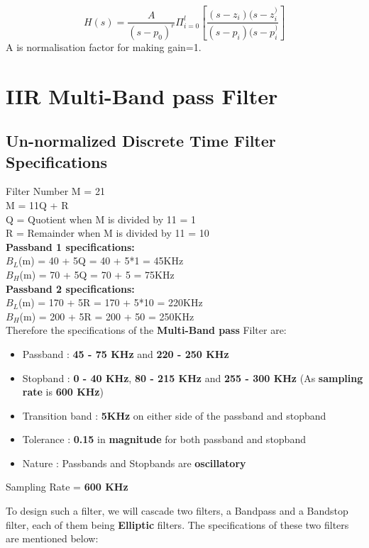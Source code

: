 \documentclass{article}
\begin{document}
\begin{equation}
    H(s) = \frac{A}{(s-p_0)^r}\Pi_{i=0}^l\left[\frac{(s-z_i)(s-z_i^)}{(s-p_i)(s-p_i^)}\right]
\end{equation}
A is normalisation factor for making gain=1.

\section{\textbf{IIR Multi-Band pass Filter}}
\subsection{\textbf{Un-normalized Discrete Time Filter Specifications}}
Filter Number M = 21\\
M = 11Q + R\\
Q = Quotient when M is divided by 11 = 1\\
R = Remainder when M is divided by 11 = 10\\
\textbf{Passband 1 specifications:} \\
$B_L$(m) = 40 + 5Q = 40 + 5*1 = 45KHz \\
$B_H$(m) = 70 + 5Q = 70 + 5 = 75KHz\\
\textbf{Passband 2 specifications:}\\
$B_L$(m) = 170 + 5R = 170 + 5*10 = 220KHz \\
$B_H$(m) = 200 + 5R = 200 + 50 = 250KHz\\
\noindent
Therefore the specifications of the \textbf{Multi-Band pass} Filter are:
\begin{itemize}
    \item Passband : \textbf{45 - 75 KHz} and \textbf{220 - 250 KHz} 
    \item Stopband : \textbf{0 - 40 KHz}, \textbf{80 - 215 KHz} and \textbf{255 - 300 KHz} (As \textbf{sampling rate} is \textbf{600 KHz})
    \item  Transition band : \textbf{5KHz} on either side of the passband and stopband
    \item  Tolerance : \textbf{0.15} in \textbf{magnitude} for both passband and stopband
    \item  Nature : Passbands and Stopbands are \textbf{oscillatory} 
\end{itemize}

Sampling Rate = \textbf{600 KHz}\\
\noindent

To design such a filter, we will cascade two filters, a Bandpass and a Bandstop filter, each of them being \textbf{Elliptic} filters. 
The specifications of these two filters are mentioned below:
\end{document}
